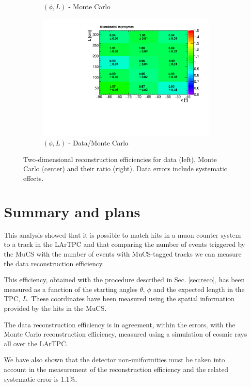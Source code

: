 \documentclass[a4paper]{scrartcl}
\begin{document}
\begin{figure}[htbp]
\begin{subfigure}{0.33\textwidth}
\caption{$(\phi,L)$ - Monte Carlo}
\end{subfigure}\begin{subfigure}{0.33\textwidth}
\includegraphics[width=\linewidth]{figures/phi_l.pdf}
\caption{$(\phi,L)$ - Data/Monte Carlo}
\end{subfigure}
\caption{Two-dimensional reconstruction efficiencies for data (left), Monte Carlo (center) and their ratio (right). Data errors include systematic effects.}\label{fig:2d}
\end{figure}

\section{Summary and plans}
This analysis showed that it is possible to match hits in a muon counter system to a track in the LArTPC and that comparing the number of events triggered by the MuCS with the number of events with MuCS-tagged tracks we can measure the data reconstruction efficiency.

This efficiency, obtained with the procedure described in Sec. \ref{sec:reco}, has been measured as a function of the starting angles $\theta$, $\phi$ and the expected length in the TPC, $L$. These coordinates have been measured using the spatial information provided by the hits in the MuCS.

The data reconstruction efficiency is in agreement, within the errors, with the Monte Carlo reconstruction efficiency, measured using a simulation of cosmic rays all over the LArTPC.

We have also shown that the detector non-uniformities must be taken into account in the measurement of the reconstruction efficiency and the related systematic error is 1.1\%.
\end{document}
